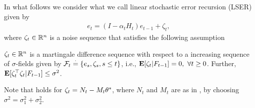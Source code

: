 In what follows we consider what we call linear stochastic error recursion (LSER) given by
\begin{align}\label{lsergen}
e_t=(I-\alpha_t H_t)e_{t-1}+\zeta_t,
\end{align}
where $\zeta_t\in \mathbb{R}^n$ is a noise sequence that satisfies the following assumption
\begin{assumption}\label{zetaassmp}
$\zeta_t\in \mathbb{R}^{n}$ is a martingale difference sequence with respect to a increasing sequence of $\sigma$-fields given by $\mathcal{F}_t\stackrel{\cdot}{=} \{e_s, \zeta_s,s\leq t\}$, i.e., $\mathbf{E}[\zeta_t|F_{t-1}]=0,~\forall t\geq 0$. Further, $\mathbf{E}[\zeta_t^\top \zeta_t|F_{t-1}]\leq \sigma^2$.
\end{assumption}
Note that  holds for $\zeta_t=N_t-M_t\theta^*$, where $N_t$ and $M_t$ are as in , by choosing $\sigma^2=\sigma_1^2+\sigma_2^2$.\par

